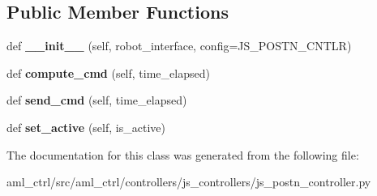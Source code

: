 \subsection*{Public Member Functions}
\begin{DoxyCompactItemize}
\item 
\hypertarget{classaml__ctrl_1_1controllers_1_1js__controllers_1_1js__postn__controller_1_1_j_s_position_controller_af16ad76a7f192562e6c552f83f0ae2c3}{}\label{classaml__ctrl_1_1controllers_1_1js__controllers_1_1js__postn__controller_1_1_j_s_position_controller_af16ad76a7f192562e6c552f83f0ae2c3} 
def {\bfseries \+\_\+\+\_\+init\+\_\+\+\_\+} (self, robot\+\_\+interface, config=J\+S\+\_\+\+P\+O\+S\+T\+N\+\_\+\+C\+N\+T\+LR)
\item 
\hypertarget{classaml__ctrl_1_1controllers_1_1js__controllers_1_1js__postn__controller_1_1_j_s_position_controller_a49c4e04ee9ae2101fee7364de101c765}{}\label{classaml__ctrl_1_1controllers_1_1js__controllers_1_1js__postn__controller_1_1_j_s_position_controller_a49c4e04ee9ae2101fee7364de101c765} 
def {\bfseries compute\+\_\+cmd} (self, time\+\_\+elapsed)
\item 
\hypertarget{classaml__ctrl_1_1controllers_1_1js__controllers_1_1js__postn__controller_1_1_j_s_position_controller_a181b5cc00fcdfb03e91e92873c399a1e}{}\label{classaml__ctrl_1_1controllers_1_1js__controllers_1_1js__postn__controller_1_1_j_s_position_controller_a181b5cc00fcdfb03e91e92873c399a1e} 
def {\bfseries send\+\_\+cmd} (self, time\+\_\+elapsed)
\item 
\hypertarget{classaml__ctrl_1_1controllers_1_1js__controllers_1_1js__postn__controller_1_1_j_s_position_controller_a3b38567197c2dc370fba864392dfcbd4}{}\label{classaml__ctrl_1_1controllers_1_1js__controllers_1_1js__postn__controller_1_1_j_s_position_controller_a3b38567197c2dc370fba864392dfcbd4} 
def {\bfseries set\+\_\+active} (self, is\+\_\+active)
\end{DoxyCompactItemize}


The documentation for this class was generated from the following file\+:\begin{DoxyCompactItemize}
\item 
aml\+\_\+ctrl/src/aml\+\_\+ctrl/controllers/js\+\_\+controllers/js\+\_\+postn\+\_\+controller.\+py\end{DoxyCompactItemize}
